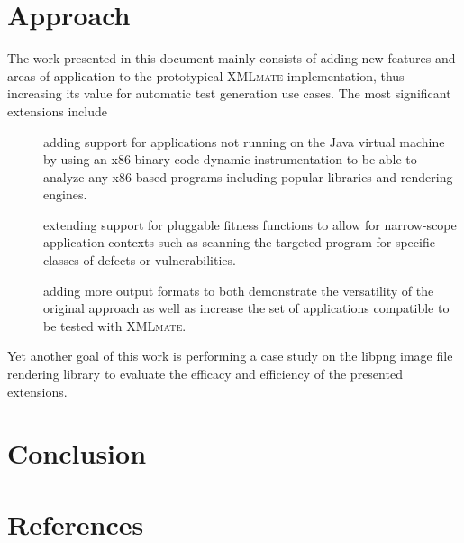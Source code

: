 \documentclass[a4paper,parskip=half]{scrartcl}
\newcommand{\java}{{\small Java}\xspace}
\newcommand{\xmlmate}{\textsc{XMLmate}\xspace}
\begin{document}

\newpage

\newpage

\newpage

\newpage
{} %
\setcounter{page}{5} %
\tableofcontents
\newpage


\section{Approach}
\label{sec:approach}
The work presented in this document mainly consists of adding new features and areas of application to the
prototypical \xmlmate implementation, thus increasing its value for automatic test generation use cases. The
most significant extensions include 
\begin{description}
\item[]adding support for applications not running on the \java virtual machine by using an x86 binary code
dynamic instrumentation to be able to analyze any x86-based programs including popular libraries and rendering
engines.
\item[]extending support for pluggable fitness functions to allow for narrow-scope application contexts such as
scanning the targeted program for specific classes of defects or vulnerabilities.
\item[]adding more output formats to both demonstrate the versatility of the original approach as well as
increase the set of applications compatible to be tested with \xmlmate.
\end{description}

Yet another goal of this work is performing a case study on the libpng image file rendering library to evaluate
the efficacy and efficiency of the presented extensions.






\section{Conclusion}
\label{sec:conclusion}

\newpage
\section*{References}
\renewcommand\refname{}


\end{document}
